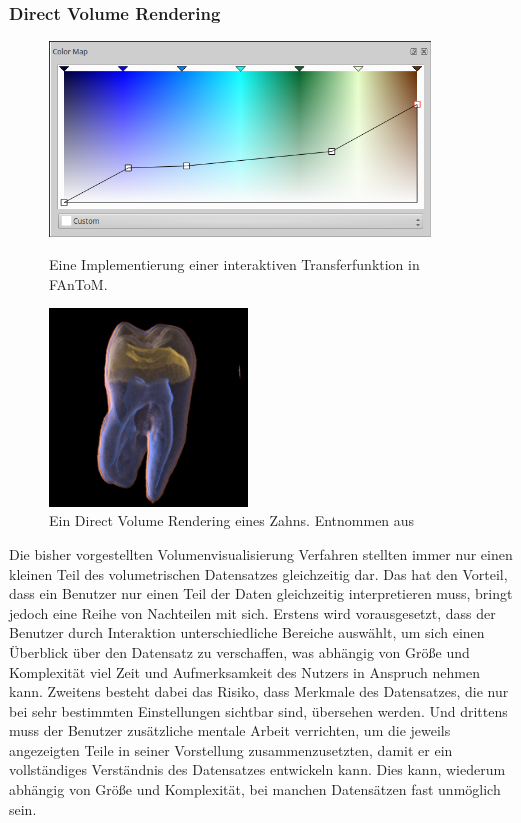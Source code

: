 \documentclass[a4paper,fontsize=12pt,toc=bib,parskip=half,ngerman]{scrartcl}
\begin{document}
\subsubsection{Direct Volume Rendering}
\label{sec:DVR}
\begin{figure}
	\begin{minipage}{0.45\textwidth}
		\centering
		\includegraphics[width=0.9\textwidth]{pictures/Colormap.png}
		\caption{Eine Implementierung einer interaktiven Transferfunktion in FAnToM.} 
		\label{Colormap}
	\end{minipage}
	\hspace{0.08\textwidth}
	\begin{minipage}{0.45\textwidth}
		\centering
		\includegraphics[width=0.47\textwidth]{pictures/Zahn.png}
		\caption{Ein Direct Volume Rendering eines Zahns. Entnommen aus \cite[S.~6]{drebin1988volume}}
		\label{Zahn}
	\end{minipage}
\end{figure}

Die bisher vorgestellten Volumenvisualisierung Verfahren stellten immer nur einen kleinen Teil des volumetrischen Datensatzes gleichzeitig dar. Das hat den Vorteil, dass ein Benutzer nur einen Teil der Daten gleichzeitig interpretieren muss, bringt jedoch eine Reihe von Nachteilen mit sich. Erstens wird vorausgesetzt, dass der Benutzer durch Interaktion unterschiedliche Bereiche ausw\"ahlt, um sich einen \"Uberblick \"uber den Datensatz zu verschaffen, was abh\"angig von Gr\"o{\ss}e und Komplexit\"at viel Zeit und Aufmerksamkeit des Nutzers in Anspruch nehmen kann. Zweitens besteht dabei das Risiko, dass Merkmale des Datensatzes, die nur bei sehr bestimmten Einstellungen sichtbar sind, \"ubersehen werden. Und drittens muss der Benutzer zus\"atzliche mentale Arbeit verrichten, um die jeweils angezeigten Teile in seiner Vorstellung zusammenzusetzten, damit er ein vollst\"andiges Verst\"andnis des Datensatzes entwickeln kann. Dies kann, wiederum abh\"angig von Gr\"o{\ss}e und Komplexit\"at, bei manchen Datens\"atzen fast unm\"oglich sein.
\end{document}
